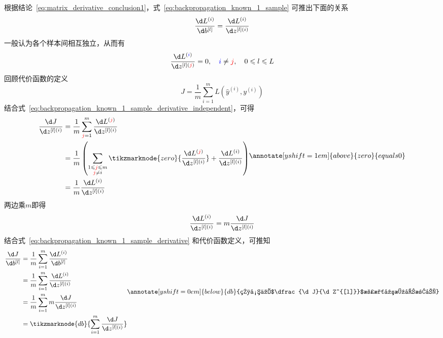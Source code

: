 根据结论~\eqref{eq:matrix_derivative_conclusion1}，式~\eqref{eq:backpropagation_known_1_sample} 可推出下面的关系
\begin{equation}
    \frac{\d L^{(i)}}{\d b^{[l]}} = \frac{\d L^{(i)}}{\d z^{[l](i)}}
    \label{eq:backpropagation_known_1_sample_derivative}
\end{equation}
一般认为各个样本间相互独立，从而有
\begin{equation}
    \frac{\d L^{(\textcolor{blue}{i})}}{\d z^{[l](\textcolor{red}{j})}}=0
    , \quad \textcolor{blue}{i} \neq \textcolor{red}{j}, \quad 0 \leqslant l \leqslant L
    \label{eq:backpropagation_known_1_sample_derivative_independent}
\end{equation}
回顾代价函数的定义
\begin{equation}
    J = \frac{1}{m} \sum_{i=1}^{m} L(\hat{y}^{(i)}, y^{(i)})
\end{equation}
结合式~\eqref{eq:backpropagation_known_1_sample_derivative_independent}，可得
\begin{equation}
    \begin{aligned}
        \frac{\d J}{\d z^{[l](i)}} 
        &= \frac{1}{m}  \sum_{\textcolor{red}{j}=1}^{m} \frac{\d L^{(\textcolor{red}{j})}}{\d z^{[l](i)}} \\
        &= \frac{1}{m}  \left( \sum_{\substack{1 \leqslant \textcolor{red}{j} \leqslant m \\ \textcolor{red}{j} \neq i}} \tikzmarknode{zero}{\frac{\d L^{(\textcolor{red}{j})}}{\d z^{[l](i)}}} + \frac{\d L^{(i)}}{\d z^{[l](i)}} \right) \\
        &= \frac{1}{m} \frac{\d L^{(i)}}{\d z^{[l](i)}} \\
    \end{aligned}
    \annotate[yshift=1em]{above}{zero}{equals 0}
\end{equation}
两边乘$m$即得
\begin{equation}
    \frac{\d L^{(i)}}{\d z^{[l](i)}} = m \frac{\d J}{\d z^{[l](i)}}
\end{equation}
结合式~\eqref{eq:backpropagation_known_1_sample_derivative} 和代价函数定义，可推知
\begin{equation}
    \begin{aligned}
        \frac{\d J}{\d b^{[l]}} 
        &= \frac{1}{m} \sum_{i=1}^{m} \frac{\d L^{(i)}}{\d b^{[l]}} \\
        &= \frac{1}{m} \sum_{i=1}^{m} \frac{\d L^{(i)}}{\d z^{[l](i)}} \\
        &= \frac{1}{m} \sum_{i=1}^{m} m \frac{\d J}{\d z^{[l](i)}} \\
        &= \tikzmarknode{db}{\sum_{i=1}^{m} \frac{\d J}{\d z^{[l](i)}}}
    \label{eq:backpropagation_conc_4}
    \end{aligned}
    \vspace{2em}
    \renewcommand{\eqnannotationstrut}{\rule[-0.7\baselineskip]{0pt}{1.5\baselineskip}}
    \annotate[yshift=0em]{below}{db}{相当于$\dfrac{\d J}{\d Z^{[l]}}$沿水平方向求和}
    \renewcommand{\eqnannotationstrut}{\strut} %
\end{equation}
